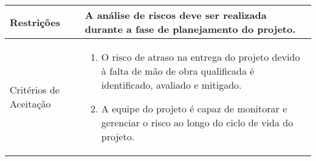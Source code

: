 \begin{table}[htbp]
\begin{tabularx}{\textwidth}{| l | X |}
    \\ \hline
    Restrições & A análise de riscos deve ser realizada durante a fase de planejamento do projeto. \\ \hline
    
    Critérios de Aceitação & 
    \begin{enumerate}
        \item O risco de atraso na entrega do projeto devido à falta de mão de obra qualificada é identificado, avaliado e mitigado.
        \item A equipe do projeto é capaz de monitorar e gerenciar o risco ao longo do ciclo de vida do projeto.
    \end{enumerate}

    \\ \hline
    \end{tabularx}
\end{table} 

